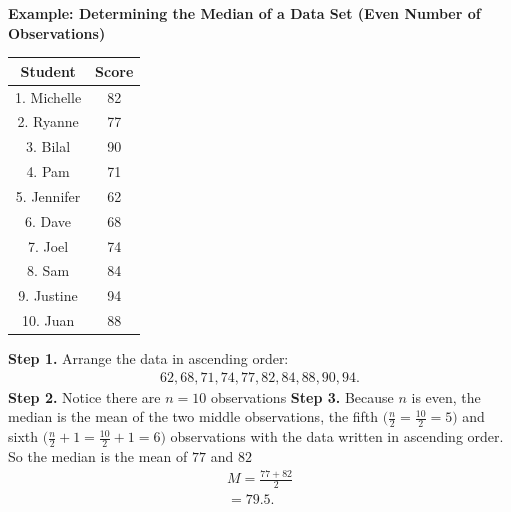 \documentclass{report}
\begin{document}
        \begin{mdframed}
          \textbf{Example: Determining the Median of a Data Set (Even Number of Observations)}
          \begin{center}
              \begin{tabular}{|c|c|}
                \hline
                \textbf{Student} & \textbf{Score} \\
                \hline
                1. Michelle & 82 \\
                \hline
                2. Ryanne & 77 \\
                \hline
                3. Bilal & 90 \\
                \hline
                4. Pam & 71 \\
                \hline
                5. Jennifer & 62 \\
                \hline
                6. Dave & 68 \\
                \hline
                7. Joel & 74 \\
                \hline
                8. Sam & 84 \\
                \hline
                9. Justine & 94 \\
                \hline
                10. Juan & 88 \\
                \hline
                \end{tabular}
          \end{center}
          \bigbreak \noindent 
          \textbf{Step 1.} Arrange the data in ascending order:
          \begin{align*}
            62,68,71,74,77,82,84,88,90,94
          .\end{align*}
          \bigbreak \noindent 
          \textbf{Step 2.} Notice there are $n=10$ observations
          \bigbreak \noindent 
          \textbf{Step 3.} Because $n$ is even, the median is the mean of the two middle observations, the fifth $\bigg(\frac{n}{2} = \frac{10}{2} = 5\bigg) $ and sixth $\bigg(\frac{n}{2} + 1 = \frac{10}{2} + 1 = 6\bigg) $  observations with the data written in ascending order. So the median is the mean of $77$ and $82$
          \begin{align*}
              M = \frac{77 + 82}{2} \\
              =79.5
          .\end{align*}
         \end{mdframed}
\end{document}
